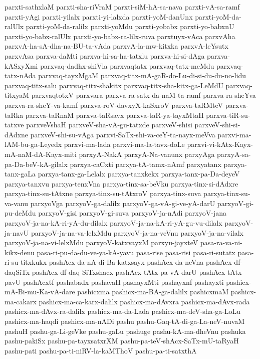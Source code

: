 {parxti-sathxlaM
parxti-sha-riVraM
parxti-siM-hA-sa-nava
parxti-vA-sa-ramf
parxti-yAgi
parxti-yilalx
parxti-yi-lalxda
parxti-yoM-danUnx
parxti-yoM-da-ralUlx
parxti-yoM-da-ralilx
parxti-yoMdu
parxti-yobabx
parxti-yo-babxnU
parxti-yo-babx-ralUlx
parxti-yo-babx-ra-lilx-ruva
parxtuyx-vAca
parxvAha
parxvA-ha-sA-dha-na-BU-ta-vAda
parxvA-la-mw-kitxka
parxvA-leYsutx
parxvAsa
parxva-daMti
parxva-hi-sa-ha-tatxlu
parxva-hi-si-dAga
parxva-kASxyXmi
parxvaq-dadhx-shiVla
parxvaqtatx
parxvaq-tatx-meMdu
parxvaq-tatx-nAda
parxvaq-tayxMgaM
parxvaq-titx-mA-gaR-do-Lu-di-si-du-du-no-lidu
parxvaq-titx-salu
parxvaq-titx-shakitx
parxvaq-titx-sha-kitx-ga-LeMdU
parxvaq-titxyaM
parxvaqtotxV
parxvara
parxva-ra-satx-da-naM-ta-ramf
parxva-ra-sheYva
parxva-ra-sheY-va-kamf
parxva-roV-davxyX-kaSxroV
parxva-taRMteV
parxva-taRka
parxva-taRnaM
parxva-taRsavx
parxva-taR-ya-tayxMtaH
parxva-tiR-su-tatxve
parxveVshaH
parxveV-sha-vA-gu-tatxde
parxveV-shisi
parxveV-shi-si-dAdxne
parxveV-shi-su-vAga
parxvi-SaTx-shi-va-ceY-ta-nayx-meVva
parxvi-ma-lAM-bu-ga-Leyedx
parxvi-ma-lada
parxvi-ma-la-tavx-doLe
parxvi-vi-kAtx-Kayx-mA-naM-dA-Kayx-miti
parxyA-NakA
parxyA-Na-vanunx
parxyAga
parxyA-sa-pa-Da-beV-kA-gilalx
parxya-caCxti
parxya-tA-tamx-nAmf
parxyatanx
parxya-tanx-gaLa
parxya-tanx-ga-Lelalx
parxya-tanxkekx
parxya-tanx-pa-Da-deyeV
parxya-tanxvu
parxya-tenxVna
parxya-tinx-sa-beVku
parxya-tinx-si-dAdxre
parxya-tinx-su-tAtxne
parxya-tinx-su-tAtxroV
parxya-tinx-suva
parxya-tinx-su-va-vanu
parxyoVga
parxyoV-ga-dalilx
parxyoV-ga-vA-gi-ve-yA-darU
parxyoV-gi-pu-deMdu
parxyoV-gisi
parxyoV-gi-suva
parxyoV-ja-nAdi
parxyoV-jana
parxyoV-ja-na-kA-ri-yA-du-dilalx
parxyoV-ja-na-kA-ri-yA-gu-vu-dilalx
parxyoV-ja-navU
parxyoV-ja-na-va-lelxMdu
parxyoV-ja-na-veVnu
parxyoV-ja-na-vilalx
parxyoV-ja-na-vi-lelxMdu
parxyoV-katxvayxM
parxyu-jayxteV
pasa-ra-va-ni-kikx-denu
pasa-ri-pu-da-du-ve-ya-kA-yavu
pasa-rise
pasa-risi
pasa-ri-sutatx
pasa-ri-su-titxkukx
pashAcx-da-nA-di-Ba-katxsayx
pashAcx-da-neVna
pashAcx-df-daqSiTx
pashAcx-df-daq-SiTxshacx
pashAcx-tAtx-pa-vA-darU
pashAcx-tAtx-pavU
pashAcxtf
pashabadx
pashavaH
pashayxMti
pashayxnf
pashayxti
pashicx-mA-Bi-mu-Ka-vA-dare
pashicxma
pashicx-ma-BA-ga-dalilx
pashicxmaM
pashicx-ma-cakarx
pashicx-ma-ca-karx-dalilx
pashicx-ma-dAvxra
pashicx-ma-dAvx-rada
pashicx-ma-dAvx-ra-dalilx
pashicx-ma-da-Lada
pashicx-ma-deV-sha-ga-LoLu
pashicx-ma-haqdi
pashicx-ma-nADi
pashu
pashu-Gaq-tA-di-ga-La-neV-nuvaM
pashuH
pashu-ga-Li-geVke
pashu-gaLu
pashuge
pashu-kA-ma-dheVnu
pashuka
pashu-pakiSx
pashu-pa-tayxsatxrXM
pashu-pa-teV-shAcx-SaTx-mU-taRyaH
pashu-pati
pashu-pa-ti-niRV-la-kaMThoV
pashu-pa-ti-satxthA
}
